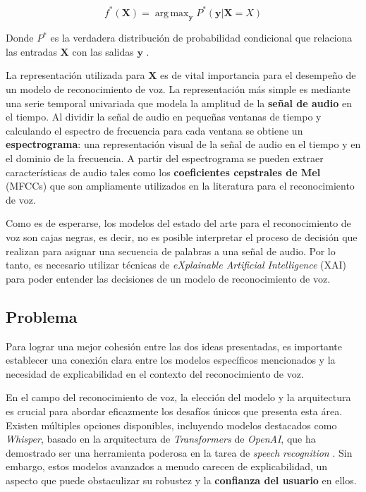 \documentclass[conference]{IEEEtran}
\DeclareMathOperator*{\argmax}{arg\,max}
\begin{document}
\begin{equation}
    f^\ast(\mathbf{X}) = \argmax_{\mathbf{y}} P^\ast(\mathbf{y}| \mathbf{X} = X)
\end{equation}

Donde $P^\ast$ es la verdadera distribución de probabilidad condicional que relaciona las entradas $\mathbf{X}$ con las salidas $\mathbf{y}$ \cite{Goodfellow-et-al-2016}.

La representación utilizada para $\mathbf{X}$ es de vital importancia para el desempeño de un modelo de reconocimiento de voz. La representación más simple es mediante una serie temporal univariada que modela la amplitud de la \textbf{señal de audio} en el tiempo. Al dividir la señal de audio en pequeñas ventanas de tiempo y calculando el espectro de frecuencia para cada ventana se obtiene un \textbf{espectrograma}: una representación visual de la señal de audio en el tiempo y en el dominio de la frecuencia. A partir del espectrograma se pueden extraer características de audio tales como los \textbf{coeficientes cepstrales de Mel} (MFCCs) que son ampliamente utilizados en la literatura para el reconocimiento de voz.

Como es de esperarse, los modelos del estado del arte para el reconocimiento de voz son cajas negras, es decir, no es posible interpretar el proceso de decisión que realizan para asignar una secuencia de palabras a una señal de audio.  Por lo tanto, es necesario utilizar técnicas de \textit{eXplainable Artificial Intelligence} (XAI) para poder entender las decisiones de un modelo de reconocimiento de voz.

\subsection{Problema}

Para lograr una mejor cohesión entre las dos ideas presentadas, es importante establecer una conexión clara entre los modelos específicos mencionados y la necesidad de explicabilidad en el contexto del reconocimiento de voz.

En el campo del reconocimiento de voz, la elección del modelo y la arquitectura es crucial para abordar eficazmente los desafíos únicos que presenta esta área. Existen múltiples opciones disponibles, incluyendo modelos destacados como \textit{Whisper}, basado en la arquitectura de \textit{Transformers} de \textit{OpenAI}, que ha demostrado ser una herramienta poderosa en la tarea de \textit{speech recognition} \cite{radford2022robust}. Sin embargo, estos modelos avanzados a menudo carecen de explicabilidad, un aspecto que puede obstaculizar su robustez y la \textbf{confianza del usuario} en ellos.
\end{document}
